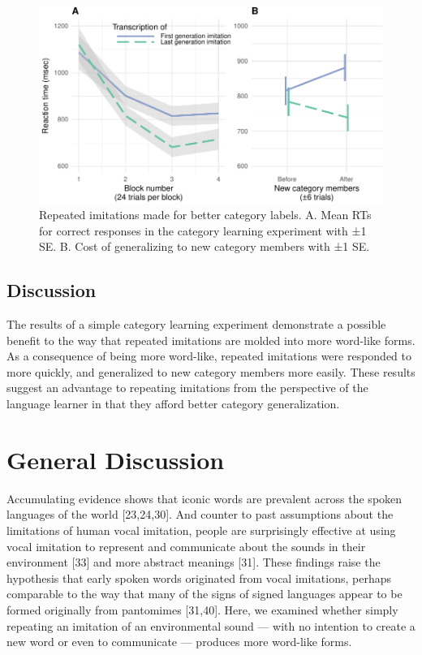 \documentclass[english,floatsintext,man]{apa6}
\theoremstyle{definition}
\theoremstyle{definition}
\theoremstyle{definition}
\theoremstyle{remark}
\begin{document}
\begin{figure}
\centering
\includegraphics{fig4-1.pdf}
\caption{\label{fig:fig4}Repeated imitations made for better category
labels. A. Mean RTs for correct responses in the category learning
experiment with ±1 SE. B. Cost of generalizing to new category members
with ±1 SE.}
\end{figure}

\hypertarget{discussion-2}{%
\subsection{Discussion}\label{discussion-2}}

The results of a simple category learning experiment demonstrate a
possible benefit to the way that repeated imitations are molded into
more word-like forms. As a consequence of being more word-like, repeated
imitations were responded to more quickly, and generalized to new
category members more easily. These results suggest an advantage to
repeating imitations from the perspective of the language learner in
that they afford better category generalization.

\hypertarget{general-discussion}{%
\section{General Discussion}\label{general-discussion}}

Accumulating evidence shows that iconic words are prevalent across the
spoken languages of the world {[}23,24,30{]}. And counter to past
assumptions about the limitations of human vocal imitation, people are
surprisingly effective at using vocal imitation to represent and
communicate about the sounds in their environment {[}33{]} and more
abstract meanings {[}31{]}. These findings raise the hypothesis that
early spoken words originated from vocal imitations, perhaps comparable
to the way that many of the signs of signed languages appear to be
formed originally from pantomimes {[}31,40{]}. Here, we examined whether
simply repeating an imitation of an environmental sound --- with no
intention to create a new word or even to communicate --- produces more
word-like forms.
\end{document}
